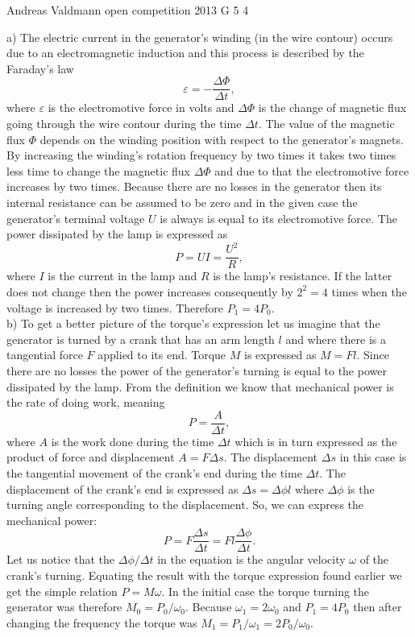 \documentclass[11pt]{article}
\begin{document}
{Andreas Valdmann} %
{open competition} %
{2013} %
{G 5} %
{4} %
{

\ifEngSolution
a) The electric current in the generator’s winding (in the wire contour) occurs due to an electromagnetic induction and this process is described by the Faraday’s law
$$
\varepsilon = -\frac{\Delta\Phi}{\Delta t},
$$
where $\varepsilon$ is the electromotive force in volts and $\Delta\Phi$ is the change of magnetic flux going through the wire contour during the time $\Delta t$. The value of the magnetic flux $\Phi$ depends on the winding position with respect to the generator’s magnets. By increasing the winding’s rotation frequency by two times it takes two times less time to change the magnetic flux $\Delta\Phi$ and due to that the electromotive force increases by two times. Because there are no losses in the generator then its internal resistance can be assumed to be zero and in the given case the generator’s terminal voltage $U$ is always is equal to its electromotive force. The power dissipated by the lamp is expressed as 
$$
P = UI = \frac{U^2}{R},
$$
where $I$ is the current in the lamp and $R$ is the lamp’s resistance. If the latter does not change then the power increases consequently by $2^2=4$ times when the voltage is increased by two times. Therefore $P_1=4P_0$.\\
b) To get a better picture of the torque’s expression let us imagine that the generator is turned by a crank that has an arm length $l$ and where there is a tangential force $F$ applied to its end. Torque $M$ is expressed as $M=Fl$. Since there are no losses the power of the generator’s turning is equal to the power dissipated by the lamp. From the definition we know that mechanical power is the rate of doing work, meaning
$$
P = \frac{A}{\Delta t},
$$
where $A$ is the work done during the time $\Delta t$ which is in turn expressed as the product of force and displacement $A=F \Delta s$. The displacement $\Delta s$ in this case is the tangential movement of the crank’s end during the time $\Delta t$. The displacement of the crank’s end is expressed as $\Delta s=\Delta\phi l$ where $\Delta\phi$ is the turning angle corresponding to the displacement. So, we can express the mechanical power:
$$
P = F \frac{\Delta s}{\Delta t} =Fl \frac{\Delta\phi}{\Delta t}.
$$
Let us notice that the $\Delta\phi / \Delta t$ in the equation is the angular velocity $\omega$ of the crank’s turning. Equating the result with the torque expression found earlier we get the simple relation $P=M\omega$. In the initial case the torque turning the generator was therefore $M_0 = P_0/\omega_0$. Because $\omega_1=2\omega_0$ and $P_1=4P_0$ then after changing the frequency the torque was $M_1 = P_1/\omega_1=2P_0/\omega_0$.
\fi
}
\end{document}
